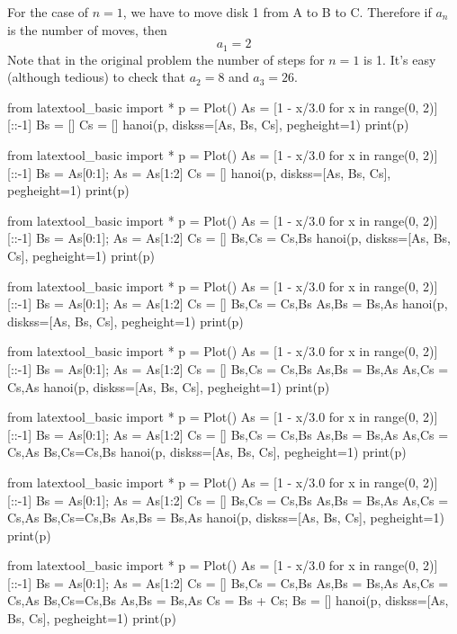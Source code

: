 For the case of $n = 1$,
we have to move disk 1 from A to B to C.
Therefore if $a_n$ is the number of moves, then
\[
a_1 = 2
\]
Note that in the original problem the number of steps for $n = 1$
is 1.
It's easy (although tedious) to check that $a_2 = 8$ and $a_3 = 26$.
\begin{python}
from latextool_basic import *
p = Plot()
As = [1 - x/3.0 for x in range(0, 2)][::-1]
Bs = []
Cs = []
hanoi(p, diskss=[As, Bs, Cs], pegheight=1)
print(p)
\end{python}
\begin{python}
from latextool_basic import *
p = Plot()
As = [1 - x/3.0 for x in range(0, 2)][::-1]
Bs = As[0:1]; As = As[1:2]
Cs = []
hanoi(p, diskss=[As, Bs, Cs], pegheight=1)
print(p)
\end{python}
\begin{python}
from latextool_basic import *
p = Plot()
As = [1 - x/3.0 for x in range(0, 2)][::-1]
Bs = As[0:1]; As = As[1:2]
Cs = []
Bs,Cs = Cs,Bs
hanoi(p, diskss=[As, Bs, Cs], pegheight=1)
print(p)
\end{python}
\begin{python}
from latextool_basic import *
p = Plot()
As = [1 - x/3.0 for x in range(0, 2)][::-1]
Bs = As[0:1]; As = As[1:2]
Cs = []
Bs,Cs = Cs,Bs
As,Bs = Bs,As
hanoi(p, diskss=[As, Bs, Cs], pegheight=1)
print(p)
\end{python}
\begin{python}
from latextool_basic import *
p = Plot()
As = [1 - x/3.0 for x in range(0, 2)][::-1]
Bs = As[0:1]; As = As[1:2]
Cs = []
Bs,Cs = Cs,Bs
As,Bs = Bs,As
As,Cs = Cs,As
hanoi(p, diskss=[As, Bs, Cs], pegheight=1)
print(p)
\end{python}
\begin{python}
from latextool_basic import *
p = Plot()
As = [1 - x/3.0 for x in range(0, 2)][::-1]
Bs = As[0:1]; As = As[1:2]
Cs = []
Bs,Cs = Cs,Bs
As,Bs = Bs,As
As,Cs = Cs,As
Bs,Cs=Cs,Bs
hanoi(p, diskss=[As, Bs, Cs], pegheight=1)
print(p)
\end{python}
\begin{python}
from latextool_basic import *
p = Plot()
As = [1 - x/3.0 for x in range(0, 2)][::-1]
Bs = As[0:1]; As = As[1:2]
Cs = []
Bs,Cs = Cs,Bs
As,Bs = Bs,As
As,Cs = Cs,As
Bs,Cs=Cs,Bs
As,Bs = Bs,As
hanoi(p, diskss=[As, Bs, Cs], pegheight=1)
print(p)
\end{python}
\begin{python}
from latextool_basic import *
p = Plot()
As = [1 - x/3.0 for x in range(0, 2)][::-1]
Bs = As[0:1]; As = As[1:2]
Cs = []
Bs,Cs = Cs,Bs
As,Bs = Bs,As
As,Cs = Cs,As
Bs,Cs=Cs,Bs
As,Bs = Bs,As
Cs = Bs + Cs; Bs = []
hanoi(p, diskss=[As, Bs, Cs], pegheight=1)
print(p)
\end{python}


